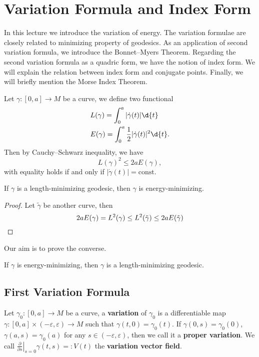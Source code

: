 \chapter{Variation Formula and Index Form}
In this lecture we introduce the variation of energy.
The variation formulae are closely related to minimizing property of geodesics.
As an application of second variation formula, we introduce the Bonnet--Myers Theorem.
Regarding the second variation formula as a quadric form, we have the notion of index form.
We will explain the relation between index form and conjugate points.
Finally, we will briefly mention the Morse Index Theorem.

Let $\gamma:[0,a]\to M$ be a curve, we define two functional
\begin{align*}
    &L(\gamma)=\int_0^a|\dot{\gamma}(t)|\d{t}\\
    &E(\gamma)=\int_0^a\frac{1}{2}|\dot{\gamma}(t)|^2\d{t}.
\end{align*}
Then by Cauchy--Schwarz inequality, we have
\[L(\gamma)^2\leq 2aE(\gamma),\]
with equality holds if and only if $|\dot{\gamma}(t)|=\text{const}$.
\begin{prop}\label{length-min implies energy-min}
    If $\gamma$ is a length-minimizing geodesic, then $\gamma$ is energy-minimizing.
\end{prop}
\begin{proof}
    Let $\tilde{\gamma}$ be another curve, then
    \[2aE(\gamma)=L^2(\gamma)\leq L^2(\tilde{\gamma})\leq 2aE(\tilde{\gamma})\qedhere\]
\end{proof}

Our aim is to prove the converse.
\begin{prop}\label{energy-min implies length-min}
    If $\gamma$ is energy-minimizing, then $\gamma$ is a length-minimizing geodesic.
\end{prop}

\section{First Variation Formula}

\begin{defn}[Variation]
    Let $\gamma_0:[0,a]\to M$ be a curve, a \textbf{variation} of $\gamma_0$ is a differentiable map $\gamma:[0,a]\times(-\varepsilon,\varepsilon)\to M$ such that $\gamma(t,0)=\gamma_0(t)$.
    If $\gamma(0,s)=\gamma_0(0)$, $\gamma(a,s)=\gamma_0(a)$ for any $s\in(-\varepsilon,\varepsilon)$, then we call it a \textbf{proper variation}.
    We call $\left.\frac{\partial{}}{\partial{s}}\right|_{s=0}\gamma(t,s)=:V(t)$ the \textbf{variation vector field}.
\end{defn}

